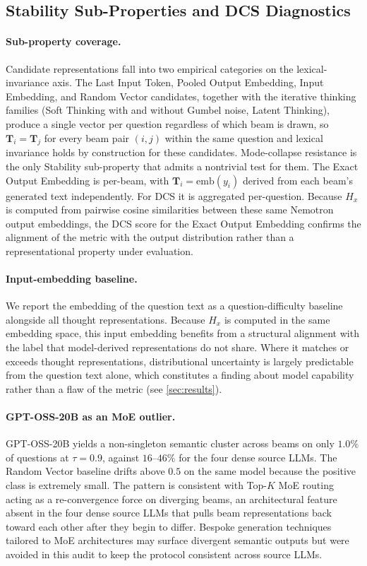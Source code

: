 \subsection{Stability Sub-Properties and DCS Diagnostics}
\label{appendix:sub:dcs_tau}

\paragraph{Sub-property coverage.} Candidate representations fall into two empirical categories on the lexical-invariance axis. The Last Input Token, Pooled Output Embedding, Input Embedding, and Random Vector candidates, together with the iterative thinking families (Soft Thinking with and without Gumbel noise, Latent Thinking), produce a single vector per question regardless of which beam is drawn, so $\mathbf{T}_i = \mathbf{T}_j$ for every beam pair $(i,j)$ within the same question and lexical invariance holds by construction for these candidates. Mode-collapse resistance is the only Stability sub-property that admits a nontrivial test for them. The Exact Output Embedding is per-beam, with $\mathbf{T}_i = \mathrm{emb}(y_i)$ derived from each beam's generated text independently. For DCS it is aggregated per-question. Because $H_x$ is computed from pairwise cosine similarities between these same Nemotron output embeddings, the DCS score for the Exact Output Embedding confirms the alignment of the metric with the output distribution rather than a representational property under evaluation.

\paragraph{Input-embedding baseline.} We report the embedding of the question text as a question-difficulty baseline alongside all thought representations. Because $H_x$ is computed in the same embedding space, this input embedding benefits from a structural alignment with the label that model-derived representations do not share. Where it matches or exceeds thought representations, distributional uncertainty is largely predictable from the question text alone, which constitutes a finding about model capability rather than a flaw of the metric (see \cref{sec:results}).

\paragraph{GPT-OSS-20B as an MoE outlier.} GPT-OSS-20B yields a non-singleton semantic cluster across beams on only $1.0\%$ of questions at $\tau = 0.9$, against $16$--$46\%$ for the four dense source LLMs. The Random Vector baseline drifts above $0.5$ on the same model because the positive class is extremely small. The pattern is consistent with Top-$K$ MoE routing acting as a re-convergence force on diverging beams, an architectural feature absent in the four dense source LLMs that pulls beam representations back toward each other after they begin to differ. Bespoke generation techniques tailored to MoE architectures may surface divergent semantic outputs but were avoided in this audit to keep the protocol consistent across source LLMs.

